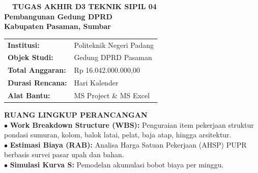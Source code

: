 \documentclass[10pt,a4paper,landscape]{article}
\begin{document}
\noindent
\begin{minipage}[t]{0.30\linewidth}
  \vspace{0pt}
  \begin{tcolorbox}[sharp corners, boxrule=0.8pt, colframe=pborder, colback=white, left=3mm, right=3mm, top=2.5mm, bottom=2.5mm, height=98mm]
    \colorbox{pred}{\fontsize{7pt}{8pt}\selectfont\bfseries\color{white}\ \ TUGAS AKHIR D3 TEKNIK SIPIL 04\ \ }\\[1.5mm]
    {\fontsize{9.5pt}{11.5pt}\selectfont\bfseries\color{pnavy}Pembangunan Gedung DPRD}\\[0.5mm]
    {\fontsize{7pt}{8.5pt}\selectfont\bfseries\color{pred}Kabupaten Pasaman, Sumbar}\\[2mm]

    \begin{tcolorbox}[sharp corners, boxrule=0.5pt, colframe=pborder, colback=pbglight, left=2mm, right=2mm, top=1.5mm, bottom=1.5mm]
      \begin{tabularx}{\linewidth}{@{}p{22mm} X@{}}
        {\fontsize{6.8pt}{8pt}\selectfont\bfseries Institusi:} & {\fontsize{6.8pt}{8pt}\selectfont Politeknik Negeri Padang} \\[0.8mm]
        {\fontsize{6.8pt}{8pt}\selectfont\bfseries Objek Studi:} & {\fontsize{6.8pt}{8pt}\selectfont Gedung DPRD Pasaman} \\[0.8mm]
        {\fontsize{6.8pt}{8pt}\selectfont\bfseries Total Anggaran:} & {\fontsize{6.8pt}{8pt}\selectfont Rp 16.042.000.000,00} \\[0.8mm]
        {\fontsize{6.8pt}{8pt}\selectfont\bfseries Durasi Rencana:} & {\fontsize{6.8pt}{8pt}\selectfont 240 Hari Kalender} \\[0.8mm]
        {\fontsize{6.8pt}{8pt}\selectfont\bfseries Alat Bantu:} & {\fontsize{6.8pt}{8pt}\selectfont MS Project \& MS Excel}
      \end{tabularx}
    \end{tcolorbox}
    \vspace{1.5mm}

    {\fontsize{7.5pt}{9pt}\selectfont\bfseries\color{pnavy}RUANG LINGKUP PERANCANGAN}\\[0.8mm]
    {\fontsize{6.5pt}{8.2pt}\selectfont\color{psteel}
    $\bullet$ \textbf{Work Breakdown Structure (WBS):} Penguraian item pekerjaan struktur pondasi sumuran, kolom, balok latai, pelat, baja atap, hingga arsitektur.\\
    $\bullet$ \textbf{Estimasi Biaya (RAB):} Analisa Harga Satuan Pekerjaan (AHSP) PUPR berbasis survei pasar upah dan bahan.\\
    $\bullet$ \textbf{Simulasi Kurva S:} Pemodelan akumulasi bobot biaya per minggu.
    }
  \end{tcolorbox}
  \vspace{2mm}


\end{minipage}
\end{document}
